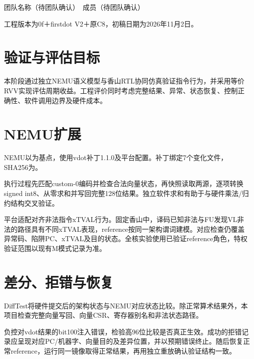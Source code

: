 

团队名称（待团队确认）　成员（待团队确认）\par
工程版本为0f＋firstdot V2＋原C8，初稿日期为2026年11月2日。\par


\section{验证与评估目标}


本阶段通过独立NEMU语义模型与香山RTL协同仿真验证指令行为，并采用等价RVV实现评估周期收益。工程评价同时考虑完整结果、异常、状态恢复、控制正确性、软件调用边界及硬件成本。\par


\section{NEMU扩展}


NEMU以为基点，使用vdot补丁1.1.0及平台配置。补丁绑定7个变化文件，SHA256为。\par


执行过程先匹配custom-0编码并检查合法向量状态，再快照读取两源，逐项转换signed int8、从零求和并写回完整128位结果。独立软件求和有助于与硬件乘法/归约结构交叉验证。\par


平台适配对齐非法指令xTVAL行为。固定香山中，译码已知非法与FU发现VL非法的路径具有不同xTVAL表现，reference按同一架构谓词建模。对应检查仍覆盖异常码、陷阱PC、xTVAL及目的状态。全核实验使用已验证reference角色，特权验证范围以现有M模式记录为准。\par


\section{差分、拒错与恢复}


DiffTest将硬件提交后的架构状态与NEMU对应状态比较。除正常算术结果外，本项目检查完整向量写回、向量CSR、寄存器别名和非法状态路径。\par


负控对vdot结果的bit100注入错误，检验高96位比较是否真正生效。成功的拒错记录应呈现对应PC/机器字、向量目的及差异位置，并以预期错误终止。随后恢复正常reference，运行同一镜像取得正常结果，再用独立重放确认验证结构一致。\par



